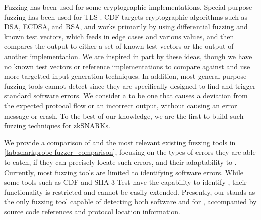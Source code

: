 Fuzzing has been used for some cryptographic implementations.
Special-purpose fuzzing has been used for TLS \cite{somorovsky2016systematic,walz2017exploiting}. CDF \cite{aumasson2017automated} targets cryptographic algorithms such as DSA, ECDSA, and RSA, and works primarily by using differential fuzzing and known test vectors, which feeds in edge cases and various values, and then compares the output to either a set of known test vectors or the output of another implementation.
We are inspired in part by these ideas, though we have no known test vectors or reference implementations to compare against and use more targetted input generation techniques.
In addition, most general purpose fuzzing tools cannot detect \textit{} since they are specifically designed to find and trigger standard software errors.
We consider a \logicerror to be one that causes a deviation from the expected protocol flow or an incorrect output, without causing an error message or crash.
To the best of our knowledge, we are the first to build such fuzzing techniques for zkSNARKs.

We provide a comparison of \snarkprobe and the most relevant existing fuzzing tools in \autoref{tab:snarkprobe-fuzzer_comparison}, focusing on the types of errors they are able to catch, if they can precisely locate such errors, and their adaptability to .  Currently, most fuzzing tools are limited to identifying software errors. While some tools such as CDF and SHA-3 Test have the capability to identify , their functionality is restricted and cannot be easily extended.
Presently, our \SnarkFuzzer stands as the only fuzzing tool capable of detecting both software and  for , accompanied by source code references and protocol location information.


